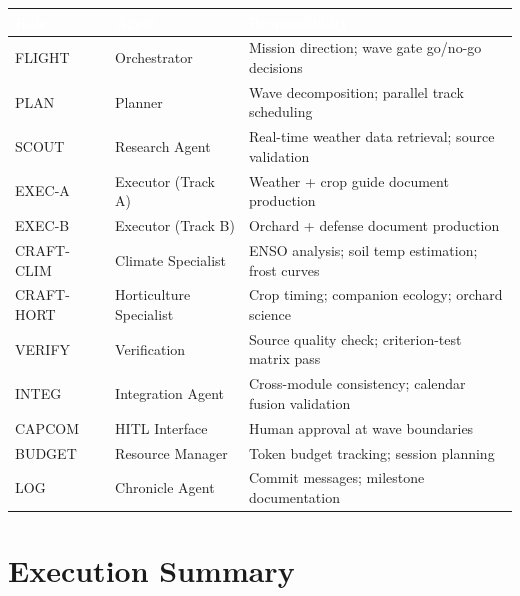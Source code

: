 \documentclass[11pt,letterpaper]{article}
\newcommand{\tableheader}[1]{\textbf{\sffamily\textcolor{white}{#1}}}
\begin{document}
\begin{center}
\begin{tabularx}{\textwidth}{L{2.5cm}L{2.5cm}X}
\toprule
{}
\tableheader{Role} & \tableheader{Agent} & \tableheader{Responsibility} \\
\midrule
FLIGHT & Orchestrator & Mission direction; wave gate go/no-go decisions \\
PLAN & Planner & Wave decomposition; parallel track scheduling \\
SCOUT & Research Agent & Real-time weather data retrieval; source validation \\
EXEC-A & Executor (Track A) & Weather + crop guide document production \\
EXEC-B & Executor (Track B) & Orchard + defense document production \\
CRAFT-CLIM & Climate Specialist & ENSO analysis; soil temp estimation; frost curves \\
CRAFT-HORT & Horticulture Specialist & Crop timing; companion ecology; orchard science \\
VERIFY & Verification & Source quality check; criterion-test matrix pass \\
INTEG & Integration Agent & Cross-module consistency; calendar fusion validation \\
CAPCOM & HITL Interface & Human approval at wave boundaries \\
BUDGET & Resource Manager & Token budget tracking; session planning \\
LOG & Chronicle Agent & Commit messages; milestone documentation \\
\bottomrule
\end{tabularx}
\end{center}

\section{Execution Summary}
\end{document}
